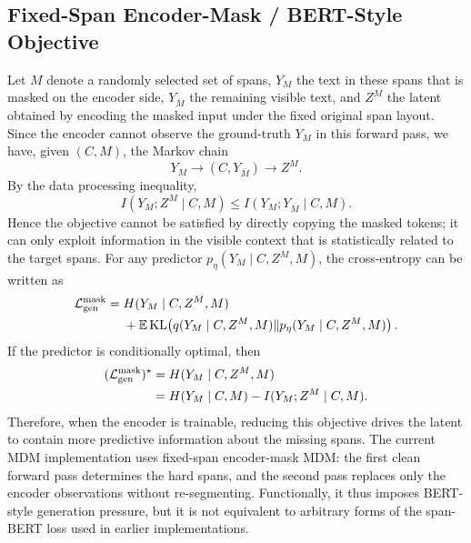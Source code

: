 \subsection{Fixed-Span Encoder-Mask / BERT-Style Objective}

Let $M$ denote a randomly selected set of spans, $Y_M$ the text in these spans that is masked on the encoder side, $Y_{\bar M}$ the remaining visible text, and $Z^M$ the latent obtained by encoding the masked input under the fixed original span layout. Since the encoder cannot observe the ground-truth $Y_M$ in this forward pass, we have, given $(C,M)$, the Markov chain
\begin{equation}
    Y_M
    \longrightarrow
    (C,Y_{\bar M})
    \longrightarrow
    Z^M.
    \label{eq:app-mask-markov}
\end{equation}
By the data processing inequality,
\begin{equation}
    I(Y_M;Z^M\mid C,M)
    \le
    I(Y_M;Y_{\bar M}\mid C,M).
    \label{eq:app-mask-dpi}
\end{equation}
Hence the objective cannot be satisfied by directly copying the masked tokens; it can only exploit information in the visible context that is statistically related to the target spans. For any predictor $p_\eta(Y_M\mid C,Z^M,M)$, the cross-entropy can be written as
\begin{equation}
\begin{aligned}
    \mathcal{L}_{\mathrm{gen}}^{\mathrm{mask}}
    ={}&H(Y_M\mid C,Z^M,M)\\
    &+\mathbb{E}\operatorname{KL}\!\left(
      q(Y_M\mid C,Z^M,M)
      \|p_\eta(Y_M\mid C,Z^M,M)
    \right).
\end{aligned}
\label{eq:app-mask-ce}
\end{equation}
If the predictor is conditionally optimal, then
\begin{equation}
\begin{aligned}
    (\mathcal{L}_{\mathrm{gen}}^{\mathrm{mask}})^\star
    &=H(Y_M\mid C,Z^M,M)\\
    &=H(Y_M\mid C,M)-I(Y_M;Z^M\mid C,M).
\end{aligned}
\label{eq:app-mask-final}
\end{equation}
Therefore, when the encoder is trainable, reducing this objective drives the latent to contain more predictive information about the missing spans. The current MDM implementation uses fixed-span encoder-mask MDM: the first clean forward pass determines the hard spans, and the second pass replaces only the encoder observations without re-segmenting. Functionally, it thus imposes BERT-style generation pressure, but it is not equivalent to arbitrary forms of the span-BERT loss used in earlier implementations.

